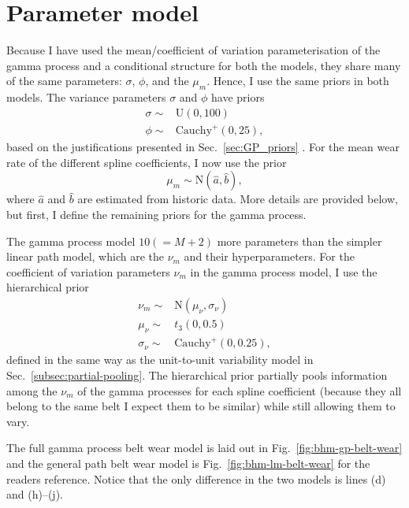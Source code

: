 \section{Parameter model} \label{sec:belt_wear_priors}
Because I have used the mean/coefficient of variation parameterisation of the gamma process and a conditional structure for both the models, they share many of the same parameters: $\sigma$, $\phi$, and the $\mu_m$. Hence, I use the same priors in both models. The variance parameters $\sigma$ and $\phi$ have priors
\begin{align*}
  \sigma \sim & \mbox{U}(0, 100)         \\
  \phi   \sim & \mbox{Cauchy}^{+}(0, 25),
\end{align*}
based on the justifications presented in Sec.~\ref{sec:GP_priors} \citep[chap.~17]{BDA2020}. For the mean wear rate of the different spline coefficients, I now use the prior 
\begin{equation*}
  \mu_m \sim \mbox{N}(\hat{a}, \hat{b}),
\end{equation*}
where $\hat{a}$ and $\hat{b}$ are estimated from historic data. More details are provided below, but first, I define the remaining priors for the gamma process.

The gamma process model $10(= M + 2)$ more parameters than the simpler linear path model, which are the $\nu_m$ and their hyperparameters. For the coefficient of variation parameters $\nu_m$ in the gamma process model, I use the hierarchical prior
\begin{align*}
  \nu_m      \sim & \mbox{N}(\mu_\nu, \sigma_\nu) \\
  \mu_\nu    \sim & t_3(0, 0.5)            \\
  \sigma_\nu \sim & \mbox{Cauchy}^{+}(0, 0.25),
\end{align*}
defined in the same way as the unit-to-unit variability model in Sec.~\ref{subsec:partial-pooling}. The hierarchical prior partially pools information among the $\nu_m$ of the gamma processes for each spline coefficient (because they all belong to the same belt I expect them to be similar) while still allowing them to vary.

The full gamma process belt wear model is laid out in Fig.~\ref{fig:bhm-gp-belt-wear} and the general path belt wear model is Fig.~\ref{fig:bhm-lm-belt-wear} for the readers reference. Notice that the only difference in the two models is lines (d) and (h)--(j).

